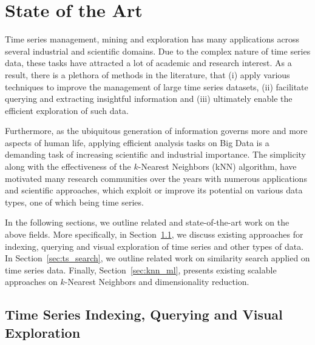 
\chapter{State of the Art} \label{chap:related}
\graphicspath{{Papers/SIGSpatial2017/}{Papers/SIGSpatial2018/}{Papers/SpringerJournalOfBigData/}}

Time series management, mining and exploration has many applications across several industrial and scientific domains. Due to the complex nature of time series data, these tasks have attracted a lot of academic and research interest. As a result, there is a plethora of methods in the literature, that (i) apply various techniques to improve the management of large time series datasets, (ii) facilitate querying and extracting insightful information and (iii) ultimately enable the efficient exploration of such data. 

Furthermore, as the ubiquitous generation of information governs more and more aspects of human life, applying efficient analysis tasks on Big Data is a demanding task of increasing scientific and industrial importance. The simplicity along with the effectiveness of the $k$-Nearest Neighbors (kNN) algorithm, have motivated many research communities over the years with numerous applications and scientific approaches, which exploit or improve its potential on various data types, one of which being time series.

In the following sections, we outline related and state-of-the-art work on the above fields. More specifically, in Section~\ref{sec:ts_index_query_explore}, we discuss existing approaches for indexing, querying and visual exploration of time series and other types of data. In Section~\ref{sec:ts_search}, we outline related work on similarity search applied on time series data. Finally, Section~\ref{sec:knn_ml}, presents existing scalable approaches on $k$-Nearest Neighbors and dimensionality reduction.

\section{Time Series Indexing, Querying and Visual Exploration}
\label{sec:ts_index_query_explore}

